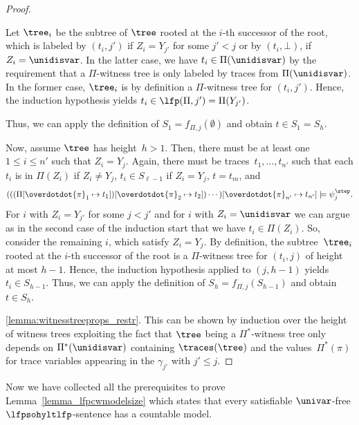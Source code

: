 \begin{proof}
\begin{itemize}
    Let $\tree_i$ be the subtree of $\tree$ rooted at the $i$-th successor of the root, which is labeled by $(t_i,j')$ if $Z_i = Y_{j'}$ for some $j' < j$ or by $(t_i, \bot)$, if $Z_i = \unidisvar$.
    In the latter case, we have $t_i \in \Pi(\unidisvar)$ by the requirement that a $\Pi$-witness tree is only labeled by traces from $\Pi(\unidisvar)$.
    In the former case, $\tree_i$ is by definition a $\Pi$-witness tree for $(t_i,j')$.
    Hence, the induction hypothesis yields $t_i \in \lfp(\Pi, j') = \Pi(Y_{j'})$.

    Thus, we can apply the definition of $S_1 = f_{\Pi,j}(\emptyset)$ and obtain $t \in S_1 = S_h$.
\end{itemize}

Now, assume $\tree$ has height~$h > 1$. Then, there must be at least one $1 \le i \le n'$ such that 
$Z_i = Y_j$. Again, there must be traces~$t_1, \ldots, t_{n'}$ such that each $t_i$ is in $\Pi(Z_i)$ if $Z_i \neq Y_j$, $t_i \in S_{\ell-1}$ if $Z_i = Y_j$, $t = t_m$, and 
    \[    (((\Pi[\overdotdot{\pi}_1 \mapsto t_1])[\overdotdot{\pi}_2 \mapsto t_2]) \cdots )[\overdotdot{\pi}_{n'} \mapsto t_{n'}]
    \models \psi_j^\step.\]
For $i$ with $Z_i = Y_{j'}$ for some $j < j'$ and for $i$ with $Z_i = \unidisvar$ we can argue as in the second case of the induction start that we have $t_i \in \Pi(Z_i)$.
So, consider the remaining $i$, which satisfy $Z_i = Y_j$. 
By definition, the subtree~$\tree_i$ rooted at the $i$-th successor of the root is a $\Pi$-witness tree for $(t_i,j)$ of height at most $h-1$. 
Hence, the induction hypothesis applied to $(j,h-1)$ yields $t_i \in S_{h-1}$. 
    Thus, we can apply the definition of $S_h = f_{\Pi,j}(S_{h-1})$ and obtain $t \in S_h$.

\ref{lemma:witnesstreeprops_restr}.
This can be shown by induction over the height of witness trees exploiting the fact that $\tree$ being a $\Pi^*$-witness tree only depends on $\Pi^*(\unidisvar)$ containing $\traces(\tree)$ and the values~$\Pi^*(\pi)$ for trace variables appearing in the $\gamma_{j'}$ with $j' \le j$.
\end{proof}

Now we have collected all the prerequisites to prove Lemma~\ref{lemma_lfpcwmodelsize} which states that every satisfiable $\univar$-free $\lfpsohyltlfp$-sentence has a countable model.

